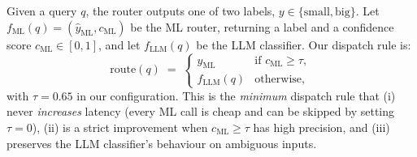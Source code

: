 \documentclass{article}
\begin{document}
Given a query $q$, the router outputs one of two labels,
$y \in \{\mathrm{small}, \mathrm{big}\}$. Let $f_{\mathrm{ML}}(q)
= (\hat{y}_{\mathrm{ML}}, c_{\mathrm{ML}})$ be the ML router, returning a
label and a confidence score $c_{\mathrm{ML}} \in [0,1]$, and let
$f_{\mathrm{LLM}}(q)$ be the LLM classifier. Our dispatch rule is:
\begin{equation}
  \mathrm{route}(q) \;=\;
  \begin{cases}
    \hat{y}_{\mathrm{ML}} & \text{if } c_{\mathrm{ML}} \geq \tau, \\
    f_{\mathrm{LLM}}(q) & \text{otherwise},
  \end{cases}
  \label{eq:cascade}
\end{equation}
with $\tau = 0.65$ in our configuration. This is the \emph{minimum} dispatch
rule that (i) never \emph{increases} latency (every ML call is cheap and can
be skipped by setting $\tau{=}0$), (ii) is a strict improvement when
$c_{\mathrm{ML}} \geq \tau$ has high precision, and (iii) preserves the LLM
classifier's behaviour on ambiguous inputs.
\end{document}
